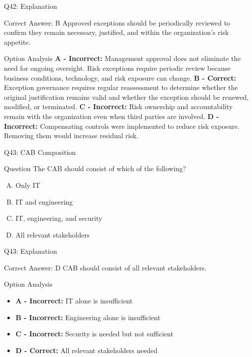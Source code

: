 \documentclass{beamer}
\begin{document}
	
	\begin{frame}[shrink=10]{Q42: Explanation} \begin{block}{Correct Answer: B} Approved exceptions should be periodically reviewed to confirm they remain necessary, justified, and within the organization's risk appetite. \end{block} \begin{block}{Option Analysis} \textbf{A - Incorrect:} Management approval does not eliminate the need for ongoing oversight. Risk exceptions require periodic review because business conditions, technology, and risk exposure can change. \vspace{0.15cm} \textbf{B - Correct:} Exception governance requires regular reassessment to determine whether the original justification remains valid and whether the exception should be renewed, modified, or terminated. \vspace{0.15cm} \textbf{C - Incorrect:} Risk ownership and accountability remain with the organization even when third parties are involved. \vspace{0.15cm} \textbf{D - Incorrect:} Compensating controls were implemented to reduce risk exposure. Removing them would increase residual risk. \end{block} 
	 \end{frame}
	
	\begin{frame}{Q43: CAB Composition}
		\begin{block}{Question}
			The CAB should consist of which of the following?
		\end{block}
		\begin{enumerate}[(A)]
			\item Only IT
			\item IT and engineering
			\item IT, engineering, and security
			\item All relevant stakeholders
		\end{enumerate}
	\end{frame}
	
	\begin{frame}{Q43: Explanation}
		\begin{block}{Correct Answer: D}
			CAB should consist of all relevant stakeholders.
		\end{block}
		\begin{block}{Option Analysis}
			\begin{itemize}
				\item \textbf{A - Incorrect:} IT alone is insufficient
				\item \textbf{B - Incorrect:} Engineering alone is insufficient
				\item \textbf{C - Incorrect:} Security is needed but not sufficient
				\item \textbf{D - Correct:} All relevant stakeholders needed
			\end{itemize}
		\end{block}
	\end{frame}
	
\end{document}
